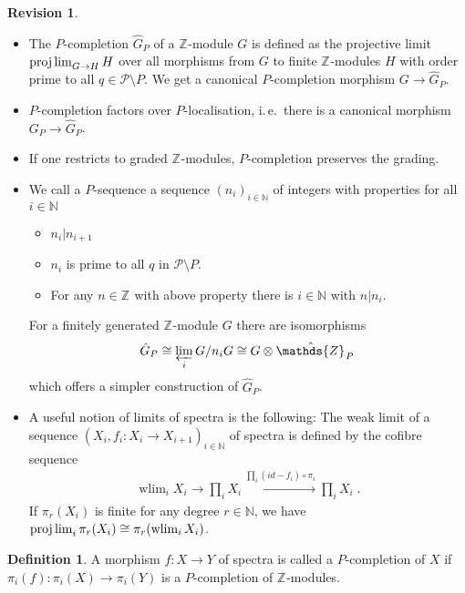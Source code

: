 \documentclass[english]{scrartcl}
\theoremstyle{definition}
\newtheorem*{Def}{Definition}
\newtheorem*{Rev}{Revision}
\theoremstyle{remark}
\newcommand*{\idest}{i.\,e.\ }
\newcommand*{\N}{\mathds{N}}
\newcommand*{\Z}[1][]{\mathds{Z}_{#1}}  %
\newcommand*{\longto}{\longrightarrow}
\newcommand*{\Ps}{P}  %
\newcommand*{\PS}{\mathcal{P}} %
\newcommand*{\pistar}[2][*]{\pi_{#1}(#2)}  %
\newcommand*{\compl}[2][\Ps]{\hat{#2}_{#1}}  %
\DeclareMathOperator{\wlim}{wlim}  %
\begin{document}
\begin{Rev}
  \begin{itemize}
  \item The $\Ps$-completion $\compl{G}$ of a $\Z$-module $G$ is
    defined as the projective limit $\projlim_{G\to H} H$ over all
    morphisms from $G$  to finite $\Z$-modules $H$ with order prime to
    all $q\in\PS\setminus\Ps$.
    We get a canonical $\Ps$-completion morphism $G\to\compl{G}$.
  \item $\Ps$-completion factors over $\Ps$-localisation, \idest there
    is a canonical morphism $G_\Ps\to\compl{G}$.
  \item If one restricts to graded $\Z$-modules, $\Ps$-completion
    preserves the grading.
  \item We call a $\Ps$-sequence a sequence $(n_i)_{i\in\N}$ of
    integers with properties for all $i\in\N$
    \begin{itemize}
    \item $n_i|n_{i+1}$
    \item $n_i$ is prime to all $q$ in $\PS\setminus\Ps$.
    \item For any $n\in\Z$ with above property there is $i\in\N$ with $n|n_i$.
    \end{itemize}
    For a finitely generated $\Z$-module $G$ there are isomorphisms
    \begin{gather*}
      \compl{G}
      \cong \varprojlim_i G/n_iG
      \cong G\otimes\compl{\Z}
    \end{gather*}
    which offers a simpler construction of $\compl{G}$.
  \item A useful notion of limits of spectra is the following:
    The weak limit of a sequence
    $(X_i, f_i\colon X_i\to X_{i+1})_{i\in\N}$ of spectra is defined
    by the cofibre sequence
    \begin{gather*}
      \wlim_{i} X_i
      \longto \prod_i X_i
      \xrightarrow{\prod_i (id-f_i)\circ \pi_i} \prod_i X_i
      \;.
    \end{gather*}
    If $\pistar[r]{X_i}$ is finite for any degree $r\in\N$, we have
    $\projlim_i \pistar[r]{X_i} \cong \pistar[r]{\wlim_i X_i}$.
  \end{itemize}
\end{Rev}
\begin{Def}
  A morphism $f\colon X\to Y$ of spectra is called a $\Ps$-completion
  of $X$ if $\pistar[i] f\colon \pistar[i] X\to \pistar[i] Y$ is a
  $\Ps$-completion of $\Z$-modules.
\end{Def}
\end{document}
